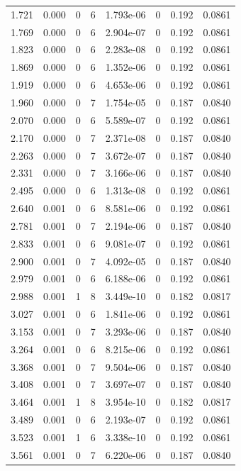 \documentclass[preview]{standalone}
\begin{document}
{{\begin{tabular}{L{1.2cm}C{1.2cm} C{0.3cm}C{0.5cm} C{1.4cm}C{1.4cm} C{1.4cm}C{1.4cm}}
  1.721  &  0.000  & 0     &  6 &  1.793e-06  & 0  & 0.192 &  0.0861   \\ 
  1.769  &  0.000  & 0     &  6 &  2.904e-07  & 0  & 0.192 &  0.0861   \\ 
  1.823  &  0.000  & 0     &  6 &  2.283e-08  & 0  & 0.192 &  0.0861   \\ 
  1.869  &  0.000  & 0     &  6 &  1.352e-06  & 0  & 0.192 &  0.0861   \\ 
  1.919  &  0.000  & 0     &  6 &  4.653e-06  & 0  & 0.192 &  0.0861   \\ 
  1.960  &  0.000  & 0     &  7 &  1.754e-05  & 0  & 0.187 &  0.0840   \\ 
  2.070  &  0.000  & 0     &  6 &  5.589e-07  & 0  & 0.192 &  0.0861   \\ 
  2.170  &  0.000  & 0     &  7 &  2.371e-08  & 0  & 0.187 &  0.0840   \\ 
  2.263  &  0.000  & 0     &  7 &  3.672e-07  & 0  & 0.187 &  0.0840   \\ 
  2.331  &  0.000  & 0     &  7 &  3.166e-06  & 0  & 0.187 &  0.0840   \\ 
  2.495  &  0.000  & 0     &  6 &  1.313e-08  & 0  & 0.192 &  0.0861   \\ 
  2.640  &  0.001  & 0     &  6 &  8.581e-06  & 0  & 0.192 &  0.0861   \\ 
  2.781  &  0.001  & 0     &  7 &  2.194e-06  & 0  & 0.187 &  0.0840   \\ 
  2.833  &  0.001  & 0     &  6 &  9.081e-07  & 0  & 0.192 &  0.0861   \\ 
  2.900  &  0.001  & 0     &  7 &  4.092e-05  & 0  & 0.187 &  0.0840   \\ 
  2.979  &  0.001  & 0     &  6 &  6.188e-06  & 0  & 0.192 &  0.0861   \\ 
  2.988  &  0.001  & 1     &  8 &  3.449e-10  & 0  & 0.182 &  0.0817   \\ 
  3.027  &  0.001  & 0     &  6 &  1.841e-06  & 0  & 0.192 &  0.0861   \\ 
  3.153  &  0.001  & 0     &  7 &  3.293e-06  & 0  & 0.187 &  0.0840   \\ 
  3.264  &  0.001  & 0     &  6 &  8.215e-06  & 0  & 0.192 &  0.0861   \\ 
  3.368  &  0.001  & 0     &  7 &  9.504e-06  & 0  & 0.187 &  0.0840   \\ 
  3.408  &  0.001  & 0     &  7 &  3.697e-07  & 0  & 0.187 &  0.0840   \\ 
  3.464  &  0.001  & 1     &  8 &  3.954e-10  & 0  & 0.182 &  0.0817   \\ 
  3.489  &  0.001  & 0     &  6 &  2.193e-07  & 0  & 0.192 &  0.0861   \\ 
  3.523  &  0.001  & 1     &  6 &  3.338e-10  & 0  & 0.192 &  0.0861   \\ 
  3.561  &  0.001  & 0     &  7 &  6.220e-06  & 0  & 0.187 &  0.0840   \\ 
\hline 
\end{tabular} 

}}
\end{document}
